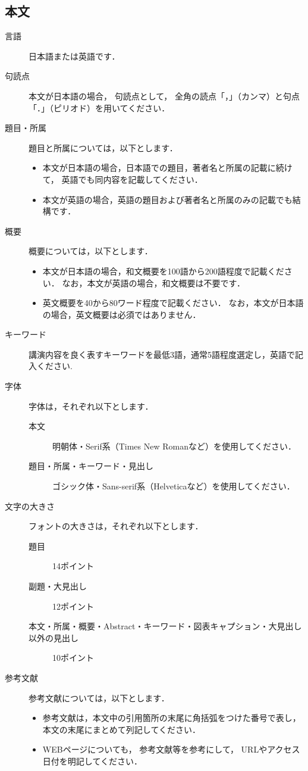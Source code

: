 \documentclass{ltjoc}
\begin{document}
\subsection{本文}
\begin{description}
\item [言語]
  日本語または英語です．
\item [句読点]
  本文が日本語の場合，
  句読点として，
  全角の読点「，」（カンマ）と句点「．」（ピリオド）を用いてください． 
\item [題目・所属]
  題目と所属については，以下とします．
  \begin{itemize}
  \item 
  本文が日本語の場合，日本語での題目，著者名と所属の記載に続けて，
  英語でも同内容を記載してください．
  \item 
  本文が英語の場合，英語の題目および著者名と所属のみの記載でも結構です．
  \end{itemize}
\item [概要]
  概要については，以下とします．
  \begin{itemize}
  \item 
    本文が日本語の場合，和文概要を100語から200語程度で記載ください．
    なお，本文が英語の場合，和文概要は不要です．
  \item 
    英文概要を40から80ワード程度で記載ください．
    なお，本文が日本語の場合，英文概要は必須ではありません．
  \end{itemize}
\item [キーワード]
  講演内容を良く表すキーワードを最低3語，通常5語程度選定し，英語で記入ください.
\item [字体]
  字体は，それぞれ以下とします．
  \begin{description}
  \item 
    [本文]
    明朝体・Serif系（Times New Romanなど）を使用してください．
  \item 
    [題目・所属・キーワード・見出し]
    ゴシック体・Sans-serif系（Helveticaなど）を使用してください．
  \end{description}
\item [文字の大きさ]
  フォントの大きさは，それぞれ以下とします．
  \begin{description}
  \item [題目]
    14ポイント
  \item [副題・大見出し]
    12ポイント
  \item [本文・所属・概要・Abstract・キーワード・図表キャプション・大見出し以外の見出し]
    10ポイント
  \end{description}
\item [参考文献]
  参考文献については，以下とします．
  \begin{itemize}
  \item 
  参考文献は，本文中の引用箇所の末尾に角括弧をつけた番号で表し，
  本文の末尾にまとめて列記してください．
  \item 
  WEBページについても，
  参考文献\cite{SIST02-200}等を参考にして，
  URLやアクセス日付を明記してください．
  \end{itemize}
\end{description}
\end{document}
